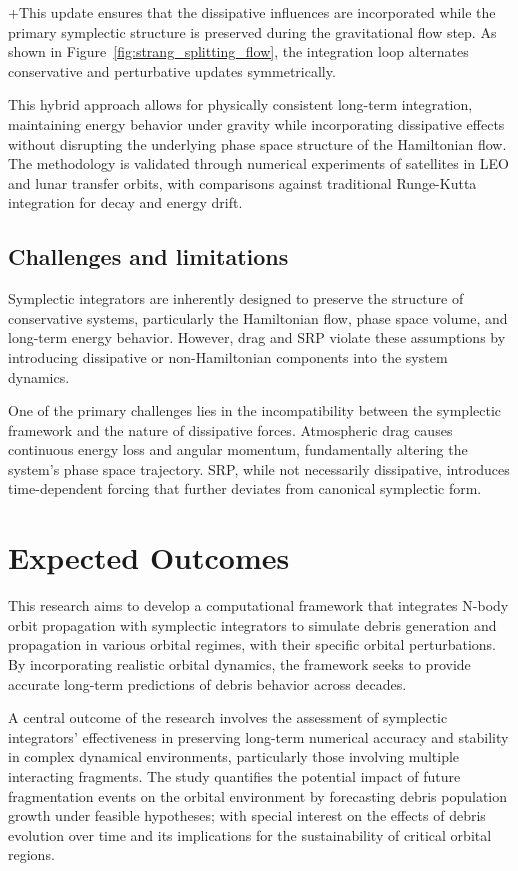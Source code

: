 \documentclass[letterpaper, preprint, paper,11pt]{AAS}	%
\begin{document}
+This update ensures that the dissipative influences are incorporated while the primary symplectic structure is preserved during the gravitational flow step. As shown in Figure~\ref{fig:strang_splitting_flow}, the integration loop alternates conservative and perturbative updates symmetrically.

This hybrid approach allows for physically consistent long-term integration, maintaining energy behavior under gravity while incorporating dissipative effects without disrupting the underlying phase space structure of the Hamiltonian flow. The methodology is validated through numerical experiments of satellites in LEO and lunar transfer orbits, with comparisons against traditional Runge-Kutta integration for decay and energy drift.

\subsection*{Challenges and limitations}

Symplectic integrators are inherently designed to preserve the structure of conservative systems, particularly the Hamiltonian flow, phase space volume, and long-term energy behavior. However, drag and SRP violate these assumptions by introducing dissipative or non-Hamiltonian components into the system dynamics.

One of the primary challenges lies in the incompatibility between the symplectic framework and the nature of dissipative forces. Atmospheric drag causes continuous energy loss and angular momentum, fundamentally altering the system's phase space trajectory. SRP, while not necessarily dissipative, introduces time-dependent forcing that further deviates from canonical symplectic form.

\section{Expected Outcomes}

This research aims to develop a computational framework that integrates N-body orbit propagation with symplectic integrators to simulate debris generation and propagation in various orbital regimes, with their specific orbital perturbations. By incorporating realistic orbital dynamics, the framework seeks to provide accurate long-term predictions of debris behavior across decades.

A central outcome of the research involves the assessment of symplectic integrators’ effectiveness in preserving long-term numerical accuracy and stability in complex dynamical environments, particularly those involving multiple interacting fragments. The study quantifies the potential impact of future fragmentation events on the orbital environment by forecasting debris population growth under feasible hypotheses; with special interest on the effects of debris evolution over time and its implications for the sustainability of critical orbital regions.
\end{document}
